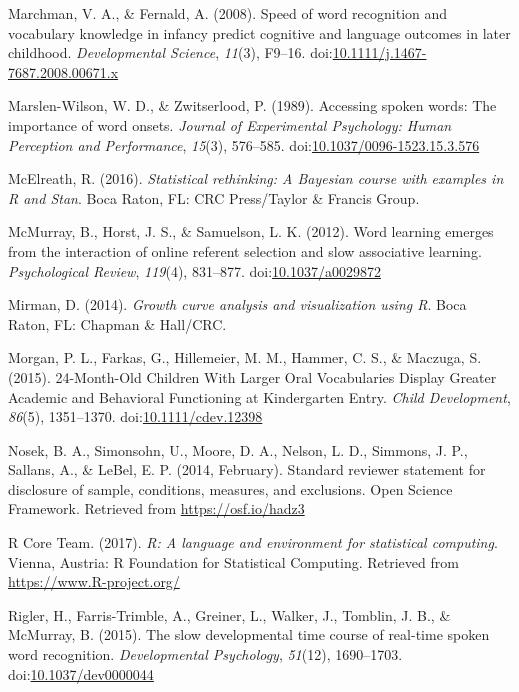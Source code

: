 \documentclass [11pt, proquest] {uwthesis}[2015/03/03]
\begin{document}
\hypertarget{ref-MarchmanFernald2008}{}
Marchman, V. A., \& Fernald, A. (2008). Speed of word recognition and
vocabulary knowledge in infancy predict cognitive and language outcomes
in later childhood. \emph{Developmental Science}, \emph{11}(3), F9--16.
doi:\href{https://doi.org/10.1111/j.1467-7687.2008.00671.x}{10.1111/j.1467-7687.2008.00671.x}

\hypertarget{ref-Marslen-Wilson1989}{}
Marslen-Wilson, W. D., \& Zwitserlood, P. (1989). Accessing spoken
words: The importance of word onsets. \emph{Journal of Experimental
Psychology: Human Perception and Performance}, \emph{15}(3), 576--585.
doi:\href{https://doi.org/10.1037/0096-1523.15.3.576}{10.1037/0096-1523.15.3.576}

\hypertarget{ref-RethinkingBook}{}
McElreath, R. (2016). \emph{Statistical rethinking: A Bayesian course
with examples in R and Stan}. Boca Raton, FL: CRC Press/Taylor \&
Francis Group.

\hypertarget{ref-McMurray2012}{}
McMurray, B., Horst, J. S., \& Samuelson, L. K. (2012). Word learning
emerges from the interaction of online referent selection and slow
associative learning. \emph{Psychological Review}, \emph{119}(4),
831--877. doi:\href{https://doi.org/10.1037/a0029872}{10.1037/a0029872}

\hypertarget{ref-Mirman2014}{}
Mirman, D. (2014). \emph{Growth curve analysis and visualization using
R}. Boca Raton, FL: Chapman \& Hall/CRC.

\hypertarget{ref-Morgan2015}{}
Morgan, P. L., Farkas, G., Hillemeier, M. M., Hammer, C. S., \& Maczuga,
S. (2015). 24-Month-Old Children With Larger Oral Vocabularies Display
Greater Academic and Behavioral Functioning at Kindergarten Entry.
\emph{Child Development}, \emph{86}(5), 1351--1370.
doi:\href{https://doi.org/10.1111/cdev.12398}{10.1111/cdev.12398}

\hypertarget{ref-OSF_Statement}{}
Nosek, B. A., Simonsohn, U., Moore, D. A., Nelson, L. D., Simmons, J.
P., Sallans, A., \& LeBel, E. P. (2014, February). Standard reviewer
statement for disclosure of sample, conditions, measures, and
exclusions. Open Science Framework. Retrieved from
\url{https://osf.io/hadz3}

\hypertarget{ref-R-base}{}
R Core Team. (2017). \emph{R: A language and environment for statistical
computing}. Vienna, Austria: R Foundation for Statistical Computing.
Retrieved from \url{https://www.R-project.org/}

\hypertarget{ref-Rigler2015}{}
Rigler, H., Farris-Trimble, A., Greiner, L., Walker, J., Tomblin, J. B.,
\& McMurray, B. (2015). The slow developmental time course of real-time
spoken word recognition. \emph{Developmental Psychology}, \emph{51}(12),
1690--1703.
doi:\href{https://doi.org/10.1037/dev0000044}{10.1037/dev0000044}
\end{document}
